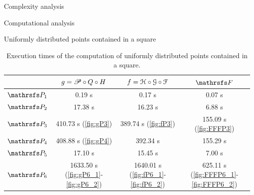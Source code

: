 \documentclass[11pt, a4paper, english, twoside, notitlepage, openright]{report}
\begin{document}
\begin{chapter}{Complexity analysis}
\begin{section}{Computational analysis}
\begin{subsection}{Uniformly distributed points contained in a square}
\begin{table}[ht!]
\begin{center}
\begin{tabular}{c || c | c | c}
& $g = \P\circ Q \circ H$ & $f=\HH\circ\GG\circ\FF$ & $\FFF$ \\ \hline \hline
$\PP_1$ & 0.19 s & 0.17 s & 0.07 s \\ \hline
$\PP_2$ & 17.38 s & 16.23 s & 6.88 s \\ \hline
$\PP_3$ & 410.73 s (\ref{fig:gP3}) & 389.74 s (\ref{fig:fP3}) & 155.09 s (\ref{fig:FFFP3}) \\ \hline
$\PP_4$ & 408.88 s (\ref{fig:gP4}) & 392.34 s & 155.29 s \\ \hline
$\PP_5$ & 17.10 s & 15.45 s & 7.00 s \\ \hline
$\PP_6$ & 1633.50 s (\ref{fig:gP6_1}-\ref{fig:gP6_2}) & 1640.01 s (\ref{fig:fP6_1}-\ref{fig:fP6_2}) & 625.11 s  (\ref{fig:FFFP6_1}-\ref{fig:FFFP6_2}) \\
\end{tabular}
\caption[Execution times of the computation of points contained in a square.]{Execution times of the computation of uniformly distributed points contained in a square.}\label{tab:square}
\end{center}
\end{table}


\end{subsection}
\end{section}
\end{chapter}
\end{document}
